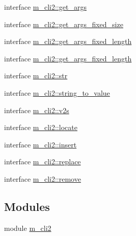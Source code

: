 \begin{DoxyCompactItemize}
\item 
interface \mbox{\hyperlink{interfacem__cli2_1_1get__args}{m\+\_\+cli2\+::get\+\_\+args}}
\item 
interface \mbox{\hyperlink{interfacem__cli2_1_1get__args__fixed__size}{m\+\_\+cli2\+::get\+\_\+args\+\_\+fixed\+\_\+size}}
\item 
interface \mbox{\hyperlink{interfacem__cli2_1_1get__args__fixed__length}{m\+\_\+cli2\+::get\+\_\+args\+\_\+fixed\+\_\+length}}
\item 
interface \mbox{\hyperlink{interfacem__cli2_1_1get__args__fixed__length}{m\+\_\+cli2\+::get\+\_\+args\+\_\+fixed\+\_\+length}}
\item 
interface \mbox{\hyperlink{interfacem__cli2_1_1str}{m\+\_\+cli2\+::str}}
\item 
interface \mbox{\hyperlink{interfacem__cli2_1_1string__to__value}{m\+\_\+cli2\+::string\+\_\+to\+\_\+value}}
\item 
interface \mbox{\hyperlink{interfacem__cli2_1_1v2s}{m\+\_\+cli2\+::v2s}}
\item 
interface \mbox{\hyperlink{interfacem__cli2_1_1locate}{m\+\_\+cli2\+::locate}}
\item 
interface \mbox{\hyperlink{interfacem__cli2_1_1insert}{m\+\_\+cli2\+::insert}}
\item 
interface \mbox{\hyperlink{interfacem__cli2_1_1replace}{m\+\_\+cli2\+::replace}}
\item 
interface \mbox{\hyperlink{interfacem__cli2_1_1remove}{m\+\_\+cli2\+::remove}}
\end{DoxyCompactItemize}
\subsection*{Modules}
\begin{DoxyCompactItemize}
\item 
module \mbox{\hyperlink{namespacem__cli2}{m\+\_\+cli2}}
\end{DoxyCompactItemize}
